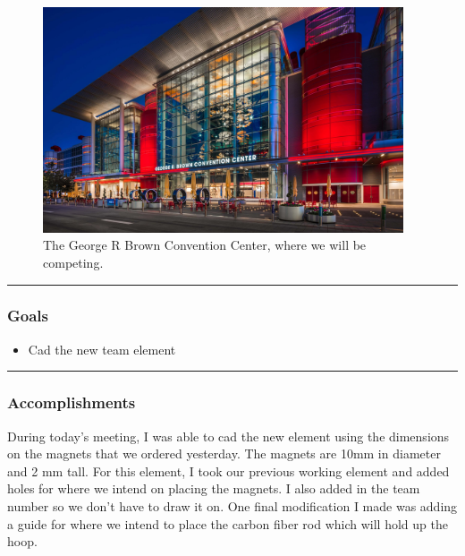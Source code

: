\begin{figure}[htp]
\centering
\includegraphics[width=0.95\textwidth, angle=0]{Meetings/April/04-14-22/04-14-22 1.JPG}
\caption{The George R Brown Convention Center, where we will be competing.}
\label{fig:041422_1}
\end{figure}



\noindent\hfil\rule{\textwidth}{.4pt}\hfil
\subsubsection*{Goals}
\begin{itemize}
    \item Cad the new team element
\end{itemize} 

\noindent\hfil\rule{\textwidth}{.4pt}\hfil

\subsubsection*{Accomplishments}
During today's meeting, I was able to cad the new element using the dimensions on the magnets that we ordered yesterday. The magnets are 10mm in diameter and 2 mm tall. For this element, I took our previous working element and added holes for where we intend on placing the magnets. I also added in the team number so we don't have to draw it on. One final modification I made was adding a guide for where we intend to place the carbon fiber rod which will hold up the hoop.


